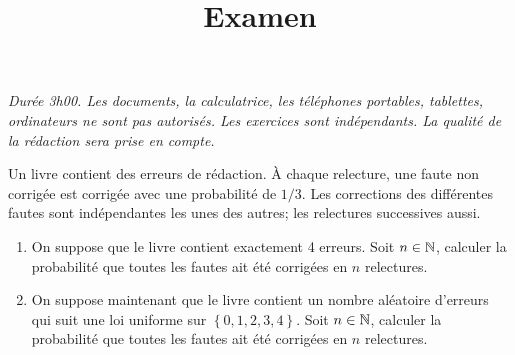 \documentclass[a4paper]{tp_um}
\title{\large \sffamily\bfseries Examen}
\begin{document}
\maketitle
\textit{Durée 3h00. Les documents, la calculatrice, les téléphones portables, tablettes, ordinateurs ne sont pas autorisés. Les exercices sont indépendants. La qualité de la rédaction sera prise en compte.} 

\bigskip
\bigskip

\exo{}
Un livre contient des erreurs de rédaction. À chaque relecture, une faute non corrigée est corrigée avec une probabilité de $1/3$. Les corrections des différentes fautes sont indépendantes les unes des autres; les relectures successives aussi.
\begin{enumerate}
    \item On suppose que le livre contient exactement 4 erreurs. Soit $n\in\mathbb{N}$, calculer la probabilité que toutes les fautes ait été corrigées en $n$ relectures. %



    
\item On suppose maintenant que le livre contient un nombre aléatoire d'erreurs qui suit une loi uniforme sur $\left\{ 0,1,2,3,4 \right\}$. Soit $n\in\mathbb{N}$, calculer la probabilité que toutes les fautes ait été corrigées en $n$ relectures.%


\end{enumerate}
\end{document}
